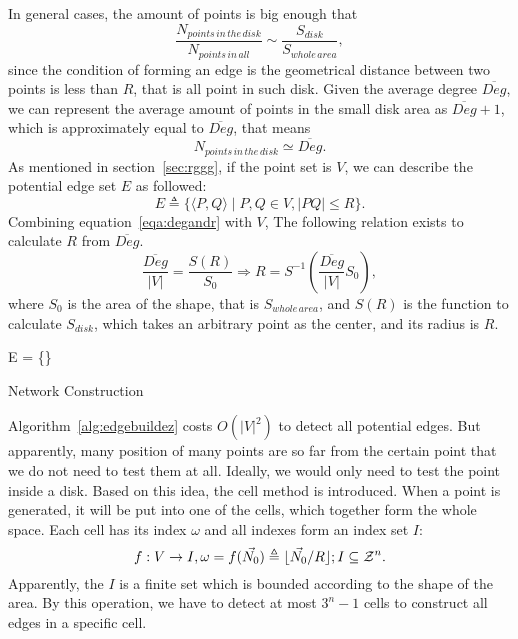 \documentclass[prodmode,acmtecs]{acmsmall} %
\begin{document}
In general cases, the amount of points is big enough that
\begin{equation}
\label{eqa:degandr}
\frac{N_{points\,in\,the\,disk}}{N_{points\,in\,all}}
\sim \frac{S_{disk}}{S_{whole\,area}},
\end{equation}
since the condition of forming an edge is the geometrical distance between two points is less than $R$, that is all point in such disk. Given the average degree $\overline{Deg}$, we can represent the average amount of points in the small disk area as $\overline{Deg}+1$, which is approximately equal to $\overline{Deg}$, that means
\begin{equation}
N_{points\,in\,the\,disk} \simeq \overline{Deg}.
\end{equation}
As mentioned in section~\ref{sec:rggg}, if the point set is $V$, we can describe the potential edge set $E$ as followed:
\begin{equation}
\label{eqn:edge}
E \triangleq \{\langle P,Q\rangle\mid{P,Q\in{V}, \left|PQ\right|\leq{R}}\}.
\end{equation}
Combining equation~\ref{eqa:degandr} with $V$, The following relation exists to calculate $R$ from $\overline{Deg}$.
\begin{equation}
\label{eqn:avgdeg2r}
\frac{\overline{Deg}}{|V|} = \frac{S(R)}{S_0} 
\Rightarrow R = S^{-1}
\left(\frac{\overline{Deg}}{|V|}S_0\right),
\end{equation}
where $S_0$ is the area of the shape, that is $S_{whole\,area}$, and $S(R)$ is the function to calculate $S_{disk}$, which takes an arbitrary point as the center, and its radius is $R$.
\begin{algorithm}[t]
\SetAlgoNoLine
{}
E = \{\}\;
\caption{Network Construction}
\label{alg:edgebuildez}
\end{algorithm}
Algorithm~\ref{alg:edgebuildez} costs $O(|V|^2)$ to detect all potential edges. But apparently, many position of many points are so far from the certain point that we do not need to test them at all. Ideally, we would only need to test the point inside a disk. Based on this idea, the cell method is introduced.
When a point is generated, it will be put into one of the cells, which together form the whole space. Each cell has its index $\omega$ and all indexes form an index set $I$:
\begin{equation}
\mathnormal{f}: V\to I, \omega = \mathnormal{f}(\vec{N_0}) \triangleq \lfloor\vec{N_0}/R\rfloor; I \subseteq \mathcal{Z}^n.
\end{equation}
Apparently, the $I$ is a finite set which is bounded according to the shape of the area. By this operation, we have to detect at most $3^{n} - 1$ cells to construct all edges in a specific cell. 
\end{document}
